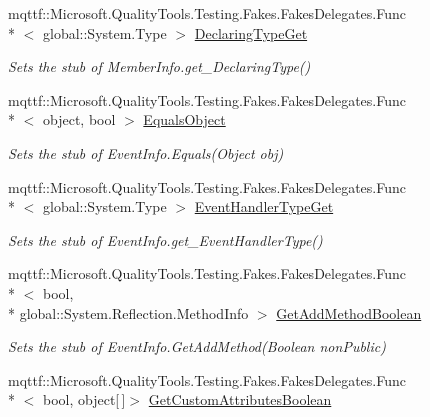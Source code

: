 \begin{DoxyCompactItemize}
mqttf\-::\-Microsoft.\-Quality\-Tools.\-Testing.\-Fakes.\-Fakes\-Delegates.\-Func\\*
$<$ global\-::\-System.\-Type $>$ \hyperlink{class_system_1_1_reflection_1_1_fakes_1_1_stub_event_info_aabbfa908f26e4e3535e5e6f4ad34a8c5}{Declaring\-Type\-Get}
\begin{DoxyCompactList}\small\item\em Sets the stub of Member\-Info.\-get\-\_\-\-Declaring\-Type()\end{DoxyCompactList}\item 
mqttf\-::\-Microsoft.\-Quality\-Tools.\-Testing.\-Fakes.\-Fakes\-Delegates.\-Func\\*
$<$ object, bool $>$ \hyperlink{class_system_1_1_reflection_1_1_fakes_1_1_stub_event_info_aef8442ec5001daf83abcc053875a7bd0}{Equals\-Object}
\begin{DoxyCompactList}\small\item\em Sets the stub of Event\-Info.\-Equals(\-Object obj)\end{DoxyCompactList}\item 
mqttf\-::\-Microsoft.\-Quality\-Tools.\-Testing.\-Fakes.\-Fakes\-Delegates.\-Func\\*
$<$ global\-::\-System.\-Type $>$ \hyperlink{class_system_1_1_reflection_1_1_fakes_1_1_stub_event_info_aa021551f738cb4f6d268c1ad733d8436}{Event\-Handler\-Type\-Get}
\begin{DoxyCompactList}\small\item\em Sets the stub of Event\-Info.\-get\-\_\-\-Event\-Handler\-Type()\end{DoxyCompactList}\item 
mqttf\-::\-Microsoft.\-Quality\-Tools.\-Testing.\-Fakes.\-Fakes\-Delegates.\-Func\\*
$<$ bool, \\*
global\-::\-System.\-Reflection.\-Method\-Info $>$ \hyperlink{class_system_1_1_reflection_1_1_fakes_1_1_stub_event_info_ab0f8cbe1b352539dd034daca484e8233}{Get\-Add\-Method\-Boolean}
\begin{DoxyCompactList}\small\item\em Sets the stub of Event\-Info.\-Get\-Add\-Method(\-Boolean non\-Public)\end{DoxyCompactList}\item 
mqttf\-::\-Microsoft.\-Quality\-Tools.\-Testing.\-Fakes.\-Fakes\-Delegates.\-Func\\*
$<$ bool, object\mbox{[}$\,$\mbox{]}$>$ \hyperlink{class_system_1_1_reflection_1_1_fakes_1_1_stub_event_info_a9192440c6dddb3dfb1285011be386fb4}{Get\-Custom\-Attributes\-Boolean}

\end{DoxyCompactItemize}
